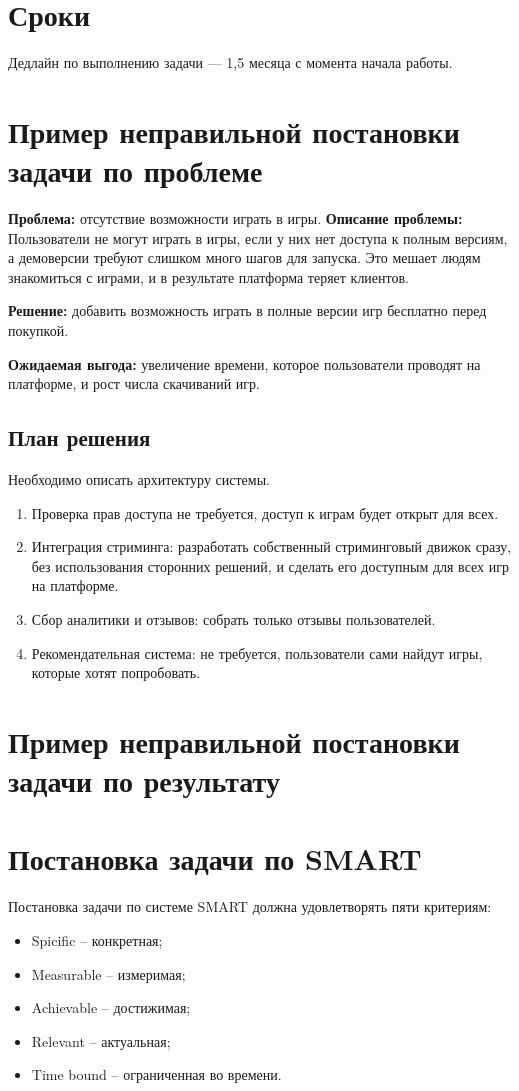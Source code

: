 \documentclass[12pt, a4paper]{article}
\begin{document}
\section*{Сроки}
Дедлайн по выполнению задачи — 1,5 месяца с момента начала работы.


\newpage
\section{Пример неправильной постановки задачи по 
проблеме}
\textbf{Проблема: } отсутствие возможности играть в 
игры.  
\textbf{Описание проблемы: } Пользователи не могут 
играть в игры, если у них нет доступа к полным 
версиям, а демоверсии требуют слишком много шагов 
для запуска. Это мешает людям знакомиться с играми, 
и в результате платформа теряет клиентов.  

\textbf{Решение: } добавить возможность играть в 
полные версии игр бесплатно перед покупкой.  

\textbf{Ожидаемая выгода: } увеличение времени, 
которое пользователи проводят на платформе, и рост 
числа скачиваний игр.  

\subsection{План решения}  
Необходимо описать архитектуру системы.  
\begin{enumerate}  
	\item Проверка прав доступа не требуется, 
	доступ к играм будет открыт для всех.  
	\item Интеграция стриминга: разработать 
	собственный стриминговый движок сразу, без 
	использования сторонних решений, и сделать его 
	доступным для всех игр на платформе.  
	\item Сбор аналитики и отзывов: собрать только 
	отзывы пользователей.  
	\item Рекомендательная система: не требуется, 
	пользователи сами найдут игры, которые 
	хотят попробовать.  
\end{enumerate}  
\newpage
\section{Пример неправильной постановки задачи по 
результату}


\newpage
\section{Постановка задачи по SMART}
Постановка задачи по системе SMART должна удовлетворять пяти критериям:
\begin{itemize}
	\item Spicific -- конкретная;
	\item Measurable -- измеримая;
	\item Achievable -- достижимая;
	\item Relevant -- актуальная;
	\item Time bound -- ограниченная во времени.
\end{itemize}
\end{document}
